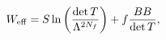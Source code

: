 \begin{equation}\label{Eq:WeffWithB}
W_{\rm eff}=S 
\ln\left(
\frac{
	\det T
}
{
	\Lambda^{2N_f}
}
\right) + f\frac{BB}{\det T},
\end{equation}

